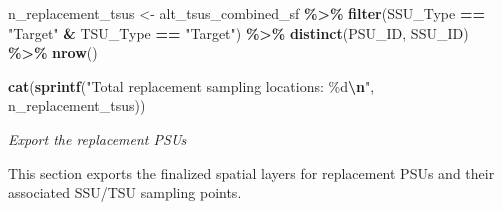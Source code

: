 \documentclass[
  10pt,
  b5paper,
  oneside]{book}
\newenvironment{Shaded}{\begin{snugshade}}{\end{snugshade}}
\newcommand{\FunctionTok}[1]{\textcolor[rgb]{0.13,0.29,0.53}{\textbf{#1}}}
\newcommand{\NormalTok}[1]{#1}
\newcommand{\OtherTok}[1]{\textcolor[rgb]{0.56,0.35,0.01}{#1}}
\newcommand{\SpecialCharTok}[1]{\textcolor[rgb]{0.81,0.36,0.00}{\textbf{#1}}}
\newcommand{\StringTok}[1]{\textcolor[rgb]{0.31,0.60,0.02}{#1}}
\begin{document}
\begin{Shaded}
\begin{Highlighting}[]
\NormalTok{n\_replacement\_tsus }\OtherTok{\textless{}{-}}\NormalTok{ alt\_tsus\_combined\_sf }\SpecialCharTok{\%\textgreater{}\%}
  \FunctionTok{filter}\NormalTok{(SSU\_Type }\SpecialCharTok{==} \StringTok{"Target"} \SpecialCharTok{\&}\NormalTok{ TSU\_Type }\SpecialCharTok{==} \StringTok{"Target"}\NormalTok{) }\SpecialCharTok{\%\textgreater{}\%}
  \FunctionTok{distinct}\NormalTok{(PSU\_ID, SSU\_ID) }\SpecialCharTok{\%\textgreater{}\%}
  \FunctionTok{nrow}\NormalTok{()}

\FunctionTok{cat}\NormalTok{(}\FunctionTok{sprintf}\NormalTok{(}\StringTok{"Total replacement sampling locations: \%d}\SpecialCharTok{\textbackslash{}n}\StringTok{"}\NormalTok{, n\_replacement\_tsus))}
\end{Highlighting}
\end{Shaded}

\emph{Export the replacement PSUs}

This section exports the finalized spatial layers for replacement PSUs and their associated SSU/TSU sampling points.
\end{document}
